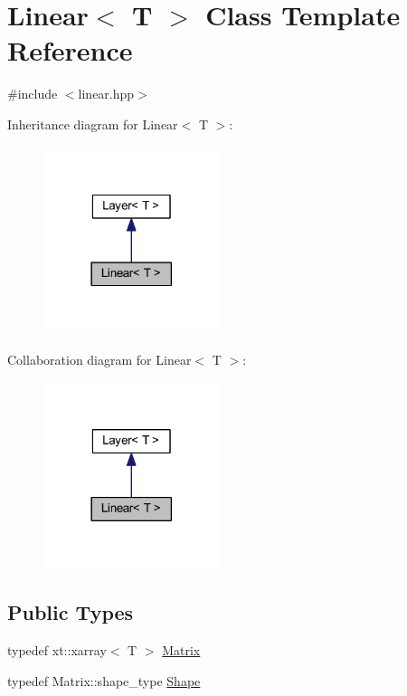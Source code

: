 \hypertarget{class_linear}{}\section{Linear$<$ T $>$ Class Template Reference}
\label{class_linear}


{\ttfamily \#include $<$linear.\+hpp$>$}



Inheritance diagram for Linear$<$ T $>$\+:\nopagebreak
\begin{figure}[H]
\begin{center}
\leavevmode
\includegraphics[width=146pt]{class_linear__inherit__graph}
\end{center}
\end{figure}


Collaboration diagram for Linear$<$ T $>$\+:\nopagebreak
\begin{figure}[H]
\begin{center}
\leavevmode
\includegraphics[width=146pt]{class_linear__coll__graph}
\end{center}
\end{figure}
\subsection*{Public Types}
\begin{DoxyCompactItemize}
\item 
typedef xt\+::xarray$<$ T $>$ \mbox{\hyperlink{class_linear_a8e402d70272bdb6406745f7ec4139f16}{Matrix}}
\item 
typedef Matrix\+::shape\+\_\+type \mbox{\hyperlink{class_linear_afeccdcd7a158d0fe034436e4eafae066}{Shape}}
\end{DoxyCompactItemize}
